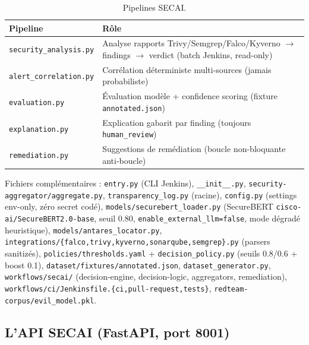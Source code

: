 \documentclass[12pt,a4paper,openany]{report}
\begin{document}
\begin{table}[h]
\centering
\small
\begin{tabular}{@{}ll@{}}
\toprule
\textbf{Pipeline} & \textbf{Rôle} \\
\midrule
\texttt{security\_analysis.py} & Analyse rapports Trivy/Semgrep/Falco/Kyverno $\rightarrow$ findings $\rightarrow$ verdict (batch Jenkins, read-only) \\
\texttt{alert\_correlation.py} & Corrélation déterministe multi-sources (jamais probabiliste) \\
\texttt{evaluation.py} & Évaluation modèle + confidence scoring (fixture \texttt{annotated.json}) \\
\texttt{explanation.py} & Explication gabarit par finding (toujours \texttt{human\_review}) \\
\texttt{remediation.py} & Suggestions de remédiation (boucle non-bloquante anti-boucle) \\
\bottomrule
\end{tabular}
\caption{Pipelines SECAI.}
\label{tab:pipelines}
\end{table}

Fichiers complémentaires : \texttt{entry.py} (CLI Jenkins), \texttt{\_\_init\_\_.py},
\texttt{security-aggregator/aggregate.py}, \texttt{transparency\_log.py} (racine),
\texttt{config.py} (settings env-only, zéro secret codé),
\texttt{models/securebert\_loader.py} (SecureBERT \texttt{cisco-ai/SecureBERT2.0-base},
seuil 0.80, \texttt{enable\_external\_llm=false}, mode dégradé heuristique),
\texttt{models/antares\_locator.py},
\texttt{integrations/\{falco,trivy,kyverno,sonarqube,semgrep\}.py} (parsers sanitizés),
\texttt{policies/thresholds.yaml} + \texttt{decision\_policy.py} (seuils 0.8/0.6 + boost 0.1),
\texttt{dataset/fixtures/annotated.json}, \texttt{dataset\_generator.py},
\texttt{workflows/secai/} (decision-engine, decision-logic, aggregators, remediation),
\texttt{workflows/ci/Jenkinsfile.\{ci,pull-request,tests\}},
\texttt{redteam-corpus/evil\_model.pkl}.

\subsection{L'API SECAI (FastAPI, port 8001)}
\end{document}
